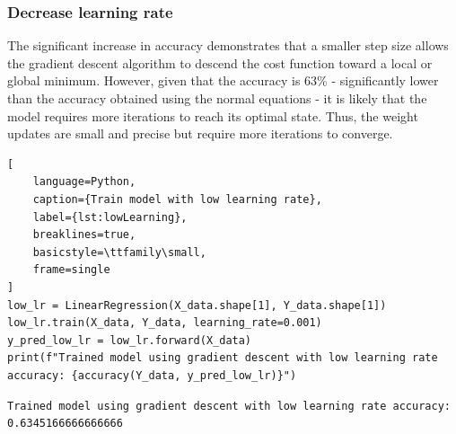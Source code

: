\documentclass[11pt]{article}
\begin{document}
\subsubsection{Decrease learning rate}
The significant increase in accuracy demonstrates that a smaller step size allows the gradient descent algorithm to descend the cost function toward a local or global minimum.
However, given that the accuracy is 63\% - significantly lower than the accuracy obtained using the normal equations - it is likely that the model requires more iterations to reach its optimal state. 
Thus, the weight updates are small and precise but require more iterations to converge.
\begin{lstlisting}[
    language=Python, 
    caption={Train model with low learning rate},
    label={lst:lowLearning},
    breaklines=true,
    basicstyle=\ttfamily\small,
    frame=single
]
low_lr = LinearRegression(X_data.shape[1], Y_data.shape[1])
low_lr.train(X_data, Y_data, learning_rate=0.001)
y_pred_low_lr = low_lr.forward(X_data)
print(f"Trained model using gradient descent with low learning rate accuracy: {accuracy(Y_data, y_pred_low_lr)}")
\end{lstlisting}
\begin{lstlisting}[style=terminal, caption={Code execution output}]
Trained model using gradient descent with low learning rate accuracy: 0.6345166666666666
\end{lstlisting}
\end{document}

